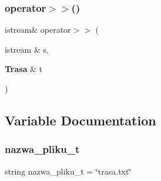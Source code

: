 \subsubsection{operator$>$$>$()}
{\footnotesize\ttfamily istream\& operator$>$$>$ (\begin{DoxyParamCaption}\item[{istream \&}]{s,  }\item[{\textbf{ Trasa} \&}]{t }\end{DoxyParamCaption})}



\subsection{Variable Documentation}
\mbox{\label{trasa_8cpp_a071ca74a9d8c791ed69b52f0393d5487}} 
\subsubsection{nazwa\+\_\+pliku\+\_\+t}
{\footnotesize\ttfamily string nazwa\+\_\+pliku\+\_\+t = \char`\"{}trasa.\+txt\char`\"{}}

